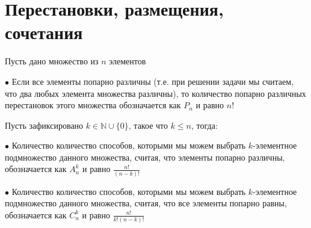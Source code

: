 \section{Перестановки, размещения, сочетания}

{
    Пусть дано множество из $n$ элементов

    $\bullet$ Если все элементы попарно различны (т.е. при решении задачи мы считаем, что два любых элемента множества различны),
    то количество попарно различных перестановок этого множества обозначается как $ P_n $ и равно $ n! $

    Пусть зафиксировано $ k \in \mathbb{N} \cup \{ 0 \} $, такое что $ k \le n $, тогда:

    $\bullet$ Количество количество способов, которыми мы можем выбрать
    $k$-элементное подмножество данного множества, считая, что элементы попарно различны, 
    обозначается как $A_n^k$ и равно $\frac{n!}{(n - k)!}$

    $\bullet$ Количество количество способов, которыми мы можем выбрать
    $k$-элементное подмножество данного множества, считая, что все элементы попарно равны, 
    обозначается как $C_n^k$ и равно $\frac{n!}{k! (n - k)!}$
}

